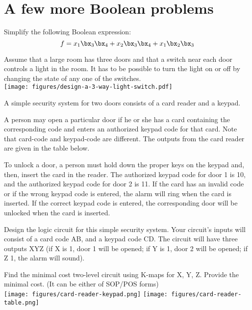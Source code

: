 
\section{A few more Boolean problems}
\begin{example}
  Simplify the following Boolean expression:
  \[ f = x_1\bx_3 \bx_4 + x_2 \bx_3 \bx_4 + x_1 \bx_2 \bx_3 \]
\end{example}

\begin{example}
  Assume that a large room has three doors and that a switch near each door controls a light in the room. It has to be possible to turn the light on or off by changing the state of any one
  of the switches.\\
  \texttt{[image: figures/design-a-3-way-light-switch.pdf]}
\end{example}


\begin{prob}
A simple security system for two doors consists of a card reader and a keypad.

A person may open a particular door if he or she has a card containing the corresponding code and enters an authorized keypad code for that card. Note that card-code and keypad-code are different. The outputs from the card reader are given in the table below.


To unlock a door, a person must hold down the proper keys on the keypad and, then, insert the card in the reader. The authorized keypad code for door 1 is 10, and the authorized keypad code for door 2 is 11. If the card has an invalid code or if the wrong keypad code is entered, the alarm will ring when the card is inserted. If the correct keypad code is entered, the corresponding door will be unlocked when the card is inserted.

Design the logic circuit for this simple security system. Your circuit’s inputs will consist of a card code AB, and a keypad code CD. The circuit will have three outputs
XYZ (if X is 1, door 1 will be opened; if Y is 1, door 2 will be opened; if Z  1, the alarm will sound).

Find the minimal cost two-level circuit using K-maps for X, Y, Z. Provide the minimal cost. (It can be either of SOP/POS forms)\\
\texttt{[image: figures/card-reader-keypad.png]}%
\texttt{[image: figures/card-reader-table.png]}
\end{prob}

